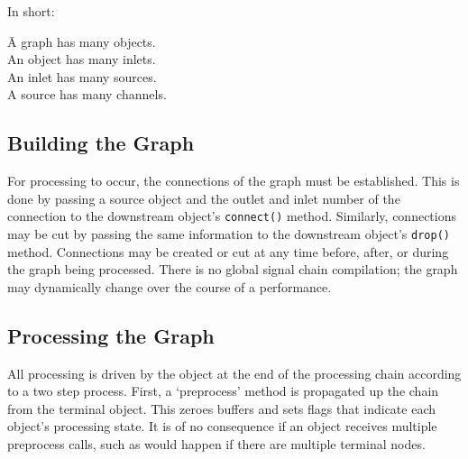 \documentclass[twoside,a4paper]{article}
\begin{document}
In short:
\begin{tabbing}
\hspace{2.6cm}\=A graph has many objects.\\
	\>An object has many inlets.\\
	\>An inlet has many sources.\\
	\>A source has many channels.
\end{tabbing}



\subsection{Building the Graph} %

For processing to occur, the connections of the graph must be established.  
This is done by passing a source object and the outlet and inlet number of the connection to the downstream object's \texttt{connect()} method.  
Similarly, connections may be cut by passing the same information to the downstream object's \texttt{drop()} method.  
Connections may be created or cut at any time before, after, or during the graph being processed.  
There is no global signal chain compilation; the graph may dynamically change over the course of a performance.



\subsection{Processing the Graph} %

All processing is driven by the object at the end of the processing chain according to a two step process.  
First, a `preprocess' method is propagated up the chain from the terminal object.  
This zeroes buffers and sets flags that indicate each object's processing state.  
It is of no consequence if an object receives multiple preprocess calls, such as would happen if there are multiple terminal nodes.
\end{document}
